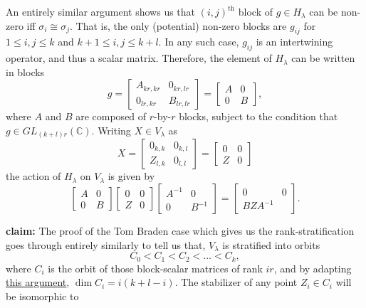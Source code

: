 \documentclass{memoir}
\newcommand{\bc}{\mathbb{C}}
\newcommand{\tx}{\text}
\theoremstyle{definition}
\begin{document}
	An entirely similar argument shows us that $(i,j)^{\tx{th}}$ block of $g\in H_\lambda$ can be non-zero iff $\sigma_i\cong\sigma_j$.  
	That is, the only (potential) non-zero blocks are $g_{ij}$ for $1\leq i, j\leq k$ and $k+1\leq i, j\leq k+l$.  
	In any such case, $g_{ij}$ is an intertwining operator, and thus a scalar matrix.  
	Therefore, the element of $H_\lambda$ can be written in blocks
	$$g=\begin{bmatrix}
		A_{kr,kr} & 0_{kr,lr}\\
		0_{lr,kr} & B_{lr,lr}
	\end{bmatrix}=\begin{bmatrix}
	A & 0 \\
	0 & B
\end{bmatrix},$$
	where $A$ and $B$ are composed of $r$-by-$r$ blocks, subject to the condition that $g\in GL_{(k+l)r}(\bc)$.    
	Writing $X\in V_\lambda$ as 
	$$X=\begin{bmatrix}
		0_{k,k} & 0_{k,l}\\
		Z_{l,k} & 0_{l,l}
	\end{bmatrix}=\begin{bmatrix}
	0 & 0 \\
	Z & 0
\end{bmatrix}$$
	the action of $H_\lambda$ on $V_\lambda$ is given by 
	$$\begin{bmatrix}
		A & 0 \\
		0 & B
	\end{bmatrix}\begin{bmatrix}
	0 & 0 \\
	Z & 0 
\end{bmatrix}\begin{bmatrix}
A^{-1} & 0 \\
0 & B^{-1}
\end{bmatrix}=\begin{bmatrix}
0 & 0 \\
BZA^{-1}
\end{bmatrix}.$$

\textbf{claim:}  The proof of the Tom Braden case which gives us the rank-stratification goes through entirely similarly to tell us that, $V_\lambda$ is stratified into orbits
%
$$C_0<C_1<C_2<... <C_k,$$
%
	where $C_i$ is the orbit of those block-scalar matrices of rank $ir$, and by adapting \href{https://math.stackexchange.com/questions/1488184/matrices-with-rank-exactly-r-as-variety}{this argument}, $\dim C_i=i(k+l-i)$. 
	The stabilizer of any point $Z_i\in C_i$ will be isomorphic to 
	
\end{document}
